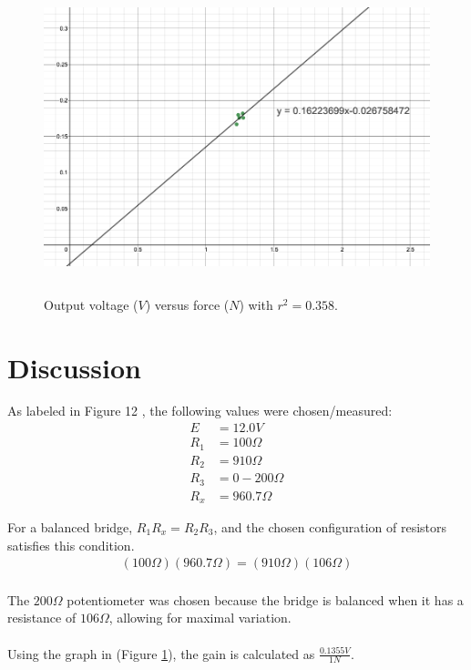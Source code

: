\documentclass[12pt]{article}
\begin{document}
\begin{figure}[ht]
    \centering
    \includegraphics[height=9cm]{linear_relation.png}
    \caption{Output voltage ($V$) versus force ($N$) with $r^2 = 0.358$.}
    \label{Figure 1}
\end{figure}

\section{Discussion}
As labeled in Figure 12 \cite{labManual}, the following values were chosen/measured:
\begin{align*}
    E   &= 12.0V \\
    R_1 &= 100\Omega \\
    R_2 &= 910\Omega \\
    R_3 &= 0\!-\!200\Omega \\
    R_x &= 960.7\Omega 
\end{align*}

For a balanced bridge, \(R_1R_x = R_2R_3\), and the chosen configuration of resistors satisfies this condition.
\begin{align*}
    \left(100\Omega\right)\left(960.7\Omega\right) = \left(910\Omega\right)\left(106\Omega\right) 
\end{align*}

\paragraph*{}
The \(200\Omega\) potentiometer was chosen because the bridge is balanced when it has a resistance of \(106\Omega\), allowing for maximal variation.

\paragraph*{}
Using the graph in (Figure \ref{Figure 1}), the gain is calculated as \(\frac{0.1355V}{1N}\).
\end{document}
